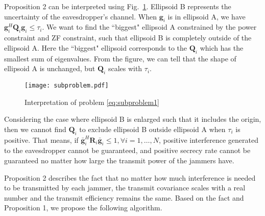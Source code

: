 \documentclass[conference]{IEEEtran}
\begin{document}
Proposition 2 can be interpreted using Fig.~\ref{fig:interpretation of subproblems}. Ellipsoid B represents the uncertainty of the eavesdropper's channel. When $\mathbf{g}_i$ is in ellipsoid A, we have $\mathbf{g}_i^H\mathbf{Q}_i\mathbf{g}_i \leq  \tau_{i}$. We want to find the ``biggest" ellipsoid A constrained by the power constraint and ZF constraint, such that ellipsoid B is completely outside of the ellipsoid A. Here the ``biggest" ellipsoid corresponds to the $\mathbf{Q}_i$ which has the smallest sum of eigenvalues.  From the figure, we can tell that the shape of ellipsoid A is unchanged, but $\mathbf{Q}_i$ scales with $\tau_i$.
\begin{figure}[ht]
	\centering
	\texttt{[image: subproblem.pdf]} %
	\caption{Interpretation of problem \eqref{eq:subproblem1}}
	\label{fig:interpretation of subproblems}
\end{figure}
Considering the case where  ellipsoid B is enlarged such that it includes the origin, then we cannot find $\mathbf{Q}_i$ to exclude ellipsoid B outside ellipsoid A when $\tau_i$ is positive. That means, if  $\bar{\mathbf{g}}_i^H\mathbf{R}_i\bar{\mathbf{g}}_i \leq 1, \forall i = 1, \ldots,N$, positive interference generated to the eavesdropper cannot be guaranteed, and positive secrecy rate cannot be guaranteed no matter how large the transmit power of the jammers have.   


Proposition 2 describes the fact that no matter how much interference is needed to be transmitted by each jammer, the transmit covariance scales with a real number and the transmit efficiency remains the same.  Based on the fact and Proposition 1, we propose the following algorithm.
\end{document}

